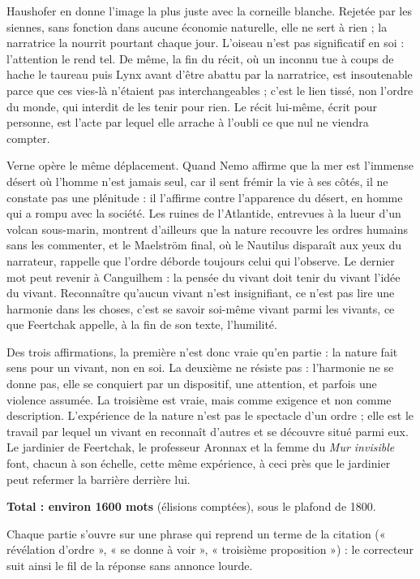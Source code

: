 \documentclass[11pt,a4paper]{article}
\begin{document}
Haushofer en donne l'image la plus juste avec la corneille blanche. Rejetée par les siennes, sans fonction dans aucune économie naturelle, elle ne sert à rien ; la narratrice la nourrit pourtant chaque jour. L'oiseau n'est pas significatif en soi : l'attention le rend tel. De même, la fin du récit, où un inconnu tue à coups de hache le taureau puis Lynx avant d'être abattu par la narratrice, est insoutenable parce que ces vies-là n'étaient pas interchangeables ; c'est le lien tissé, non l'ordre du monde, qui interdit de les tenir pour rien. Le récit lui-même, écrit pour personne, est l'acte par lequel elle arrache à l'oubli ce que nul ne viendra compter.

Verne opère le même déplacement. Quand Nemo affirme que la mer est l'immense désert où l'homme n'est jamais seul, car il sent frémir la vie à ses côtés, il ne constate pas une plénitude : il l'affirme contre l'apparence du désert, en homme qui a rompu avec la société. Les ruines de l'Atlantide, entrevues à la lueur d'un volcan sous-marin, montrent d'ailleurs que la nature recouvre les ordres humains sans les commenter, et le Maelström final, où le Nautilus disparaît aux yeux du narrateur, rappelle que l'ordre déborde toujours celui qui l'observe. Le dernier mot peut revenir à Canguilhem : la pensée du vivant doit tenir du vivant l'idée du vivant. Reconnaître qu'aucun vivant n'est insignifiant, ce n'est pas lire une harmonie dans les choses, c'est se savoir soi-même vivant parmi les vivants, ce que Feertchak appelle, à la fin de son texte, l'humilité.

Des trois affirmations, la première n'est donc vraie qu'en partie : la nature fait sens pour un vivant, non en soi. La deuxième ne résiste pas : l'harmonie ne se donne pas, elle se conquiert par un dispositif, une attention, et parfois une violence assumée. La troisième est vraie, mais comme exigence et non comme description. L'expérience de la nature n'est pas le spectacle d'un ordre ; elle est le travail par lequel un vivant en reconnaît d'autres et se découvre situé parmi eux. Le jardinier de Feertchak, le professeur Aronnax et la femme du \emph{Mur invisible} font, chacun à son échelle, cette même expérience, à ceci près que le jardinier peut refermer la barrière derrière lui.

\textbf{Total : environ 1600 mots} (élisions comptées), sous le plafond de 1800.

\begin{methode}

Chaque partie s'ouvre sur une phrase qui reprend un terme de la citation (« révélation d'ordre », « se donne à voir », « troisième proposition ») : le correcteur suit ainsi le fil de la réponse sans annonce lourde.

\end{methode}
\end{document}
